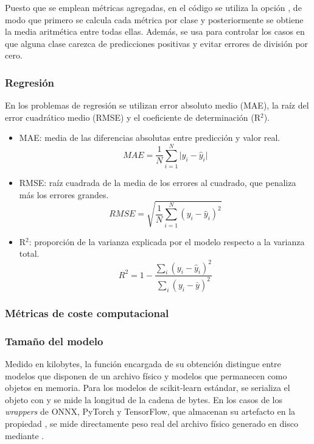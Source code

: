 \documentclass[a4paper,12pt,twoside,final]{book}
\begin{document}
Puesto que se emplean métricas agregadas, en el código se utiliza la opción , de modo que primero
se calcula cada métrica por clase y posteriormente se obtiene la media aritmética entre todas ellas. Además, se usa
 para controlar los casos en que alguna clase carezca de predicciones positivas y evitar errores
de división por cero.

\subsubsection{Regresión}
En los problemas de regresión se utilizan error absoluto medio (MAE), la raíz del error cuadrático medio (RMSE) y el
coeficiente de determinación (R$^2$).\\

\begin{itemize}
  \item MAE: media de las diferencias absolutas entre predicción y valor real.
  \[
  MAE = \frac{1}{N} \sum_{i=1}^{N} \vert{}y_i-\hat{y}_i\vert{}
  \]

  \item RMSE: raíz cuadrada de la media de los errores al cuadrado, que penaliza más los errores grandes.
  \[
  RMSE = \sqrt{\frac{1}{N} \sum_{i=1}^{N} (y_i-\hat{y}_i)^2}
  \]

  \item R$^2$: proporción de la varianza explicada por el modelo respecto a la varianza total.
  \[
  R^2 = 1 - \frac{\sum_i(y_i-\hat{y}_i)^2}{\sum_i(y_i-\bar{y})^2}
  \]
\end{itemize}

\subsubsection{Métricas de coste computacional}
\subsubsection{Tamaño del modelo}
Medido en kilobytes, la función encargada de su obtención distingue entre modelos que disponen de un archivo físico y
modelos que permanecen como objetos en memoria. Para los modelos de scikit-learn estándar, se serializa el objeto con
 y se mide la longitud de la cadena de bytes. En los casos de los \textit{wrappers} de ONNX, PyTorch
y TensorFlow, que almacenan su artefacto en la propiedad , se mide directamente peso real del
archivo físico generado en disco mediante .\\
\end{document}
